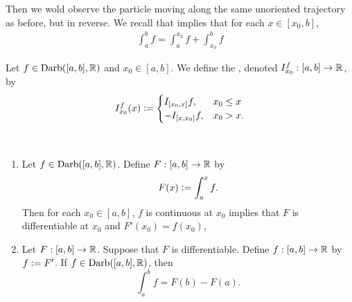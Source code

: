 \documentclass{book}
\begin{document}
	
	
	Then we wold observe the particle moving along the same unoriented trajectory as before, but in reverse. 
	We recall that  implies that for each $x \in [x_0, b]$,
	\begin{align*}
		\int_a^b f = \int_a^{x_0} f + \int_{x_0}^b f
	\end{align*}
	
	\begin{defn}
		Let $f \in \text{Darb}([a,b], \mathbb{R})$ and $x_0 \in [a,b]$. We define the , denoted $I^f_{x_0}: [a,b] \rightarrow \mathbb{R}$, by 
		\[
		I^f_{x_0}(x) \vcentcolon=
		\begin{cases}
			I_{[x_0, x]} f, & x_0 \leq x \\
			-I_{[x, x_0]} f, & x_0 > x.
		\end{cases}
		\] 
	\end{defn}
	
	\begin{ex}  \\
		\begin{enumerate}
			\item Let $f \in \text{Darb}([a,b], \mathbb{R})$. Define $F: [a,b] \rightarrow \mathbb{R}$ by 
			$$F(x) \vcentcolon= \int_a^x f.$$ 
			Then for each $x_0 \in [a,b]$, $f$ is continuous at $x_0$ implies that $F$ is differentiable at $x_0$ and $F'(x_0) = f(x_0)$,  
			\item Let $F: [a,b] \rightarrow \mathbb{R}$. Suppose that $F$ is differentiable. Define $f: [a,b] \rightarrow \mathbb{R}$ by $f \vcentcolon= F'$. If $f \in \text{Darb}([a,b], \mathbb{R})$, then
			$$\int_a^b f = F(b) - F(a).$$
		\end{enumerate}
	\end{ex}
	
\end{document}
